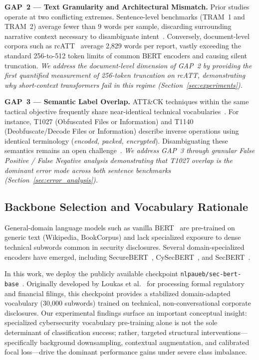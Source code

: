\documentclass[runningheads]{llncs}
\begin{document}
\textbf{GAP~2 --- Text Granularity and Architectural Mismatch.} Prior studies operate at two conflicting extremes. Sentence-level benchmarks (TRAM~1 and TRAM~2) average fewer than 9 words per sample, discarding surrounding narrative context necessary to disambiguate intent~\cite{orbinato2022automatic,husari2017ttpdrill}. Conversely, document-level corpora such as rcATT~\cite{legoy2020rcatt} average 2,829 words per report, vastly exceeding the standard 256-to-512 token limits of common BERT encoders and causing silent truncation. \emph{We address the document-level dimension of GAP~2 by providing the first quantified measurement of 256-token truncation on rcATT, demonstrating why short-context transformers fail in this regime (Section~\ref{sec:experiments}).}

\textbf{GAP~3 --- Semantic Label Overlap.} ATT\&CK techniques within the same tactical objective frequently share near-identical technical vocabularies~\cite{albarrak2025acmapper}. For instance, T1027 (Obfuscated Files or Information) and T1140 (Deobfuscate/Decode Files or Information) describe inverse operations using identical terminology (\emph{encoded, packed, encrypted}). Disambiguating these semantics remains an open challenge~\cite{li2024automated}. \emph{We address GAP~3 through granular False Positive / False Negative analysis demonstrating that T1027 overlap is the dominant error mode across both sentence benchmarks (Section~\ref{sec:error_analysis}).}

\subsection{Backbone Selection and Vocabulary Rationale}
General-domain language models such as vanilla BERT~\cite{devlin2019bert} are pre-trained on generic text (Wikipedia, BookCorpus) and lack specialized exposure to dense technical subwords common in security disclosures. Several domain-specialized encoders have emerged, including SecureBERT~\cite{aghaei2022securebert}, CySecBERT~\cite{bayer2022cybersecbert}, and SecBERT~\cite{jackaduma2020secbert}. 

In this work, we deploy the publicly available checkpoint \texttt{nlpaueb/sec-bert-base}~\cite{secbert2022}. Originally developed by Loukas et al.~\cite{secbert2022} for processing formal regulatory and financial filings, this checkpoint provides a stabilized domain-adapted vocabulary (30,000 subwords) trained on technical, non-conversational corporate disclosures. Our experimental findings surface an important conceptual insight: specialized cybersecurity vocabulary pre-training alone is not the sole determinant of classification success; rather, targeted structural interventions---specifically background downsampling, contextual augmentation, and calibrated focal loss---drive the dominant performance gains under severe class imbalance.
\end{document}
